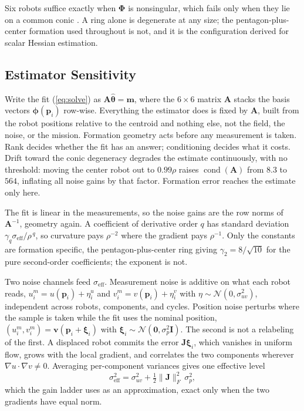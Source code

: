 \documentclass[lettersize,journal]{IEEEtran}
\begin{document}
Six robots suffice exactly when $\boldsymbol{\Phi}$ is nonsingular, which
fails only when they lie on a common conic \cite{2}. A ring alone is
degenerate at any size; the pentagon-plus-center formation used
throughout is not, and it is the configuration \cite{4} derived for
scalar Hessian estimation.

\subsection{Estimator Sensitivity}
\label{sec:sensitivity}

Write the fit (\ref{eq:solve}) as $\mathbf{A}\hat{\boldsymbol{\theta}} =
\mathbf{m}$, where the $6 \times 6$ matrix $\mathbf{A}$ stacks the basis
vectors $\boldsymbol{\phi}(\mathbf{p}_i)$ row-wise. Everything the
estimator does is fixed by $\mathbf{A}$, built from the robot positions
relative to the centroid and nothing else, not the field, the
noise, or the mission. Formation geometry acts before any measurement is
taken. Rank decides whether the fit has an answer; conditioning decides
what it costs. Drift toward the conic degeneracy degrades the estimate
continuously, with no threshold: moving the center
robot out to $0.99\rho$ raises $\operatorname{cond}(\mathbf{A})$ from
$8.3$ to $564$, inflating all noise gains by that factor. Formation
error reaches the estimate only here.

The fit is linear in the measurements, so the noise gains are the row
norms of $\mathbf{A}^{-1}$, geometry again. A coefficient of derivative
order $q$ has standard deviation $\gamma_q \sigma_{\mathrm{eff}} /
\rho^{\,q}$, so curvature pays $\rho^{-2}$ where the gradient pays
$\rho^{-1}$. Only the constants are formation specific, the
pentagon-plus-center ring giving $\gamma_2 = 8/\sqrt{10}$ for the pure
second-order coefficients; the exponent is not.

Two noise channels feed $\sigma_{\mathrm{eff}}$. Measurement noise is
additive on what each robot reads, $u_i^m = u(\mathbf{p}_i) + \eta_i^u$
and $v_i^m = v(\mathbf{p}_i) + \eta_i^v$ with $\eta \sim
\mathcal{N}(0, \sigma_{uv}^2)$, independent across robots, components,
and cycles. Position noise perturbs where the sample is taken while the
fit uses the nominal position, $(u_i^m, v_i^m) =
\mathbf{v}(\mathbf{p}_i + \boldsymbol{\xi}_i)$ with
$\boldsymbol{\xi}_i \sim \mathcal{N}(\mathbf{0}, \sigma_p^2\mathbf{I})$.
The second is not a relabeling of the first. A displaced robot commits
the error $\mathbf{J}\boldsymbol{\xi}_i$, which vanishes in uniform
flow, grows with the local gradient, and correlates the two components
wherever $\nabla u \cdot \nabla v \neq 0$. Averaging per-component
variances gives one effective level
\begin{equation}
    \sigma_{\mathrm{eff}}^2 = \sigma_{uv}^2
        + \tfrac{1}{2}\lVert\mathbf{J}\rVert_F^2\,\sigma_p^2 ,
    \label{eq:sigma_eff}
\end{equation}
which the gain ladder uses as an approximation, exact only when the two
gradients have equal norm.
\end{document}
